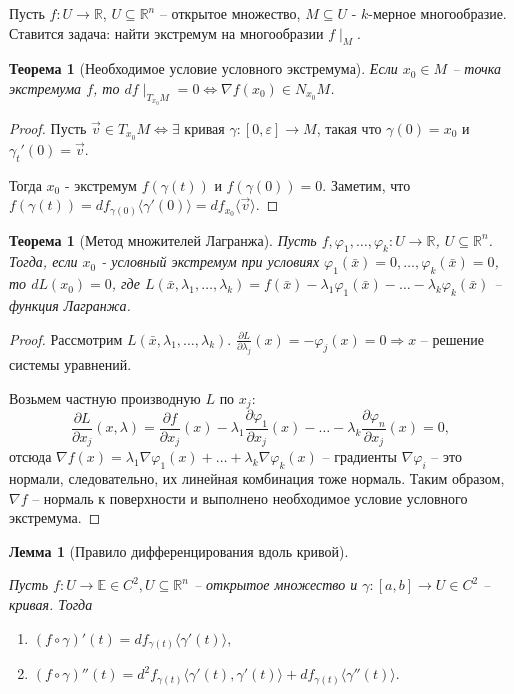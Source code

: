 \documentclass[a5paper]{article}
\newcounter{through}
\theoremstyle{plain}
\newtheorem{theorem}[through]{Теорема}
\newtheorem{lemma}[through]{Лемма}
\theoremstyle{definition}
\numberwithin{through}{section}
\numberwithin{equation}{section}
\begin{document}
Пусть $f: U \to \mathbb{R}$, $U \subseteq \mathbb{R}^n$ -- открытое множество, $M \subseteq U$ - $k$-мерное многообразие. Ставится задача: найти экстремум на многообразии $f\mid_{M}$.

\begin{theorem}[Необходимое условие условного экстремума]
	Если $x_0 \in M$ -- точка экстремума $f$, то $df\mid_{T_{x_0}M} = 0 \Leftrightarrow \nabla f(x_0) \in N_{x_0}M$.
\end{theorem}

\begin{proof}
	Пусть $\vec{v} \in T_{x_0}M \Longleftrightarrow \exists $ кривая $\gamma : [0, \varepsilon] \to M$, такая что $\gamma(0) = x_0$ и $\gamma_t'(0) = \vec{v}$.
	
	Тогда $x_0$ - экстремум $f(\gamma(t))$ и $f(\gamma(0)) = 0$. Заметим, что $f(\gamma(t))= df_{\gamma(0)}\langle \gamma'(0)\rangle=df_{x_0} \langle \vec{v} \rangle$.
\end{proof}

\begin{theorem}[Метод множителей Лагранжа]
	Пусть $f, \varphi_1, \ldots, \varphi_k : U \to \mathbb{R}$, $U \subseteq \mathbb{R}^n$. Тогда, если $x_0$ - условный экстремум при условиях $\varphi_1(\bar{x}) = 0, \ldots, \varphi_k(\bar{x})  = 0$, то $dL(x_0) = 0$, где $L(\bar{x}, \lambda_1, \ldots, \lambda_k)=f(\bar{x}) - \lambda_1\varphi_1(\bar{x}) - \ldots - \lambda_k\varphi_k(\bar{x})$ -- функция Лагранжа.
\end{theorem}

\begin{proof}
	Рассмотрим $L(\bar{x}, \lambda_1,\ldots,\lambda_k)$. $\frac{\partial L}{\partial \lambda_j}(x) = - \varphi_j(x) = 0 \Rightarrow x$ -- решение системы уравнений. 
	
	Возьмем частную производную $L$ по $x_j$:
	\[ \frac{\partial L}{\partial x_j} (x, \lambda) = \frac{\partial f}{\partial x_j}(x) - 
	\lambda_1\frac{\partial \varphi_1}{\partial x_j}(x) - 
	\ldots - \lambda_k \frac{\partial \varphi_n}{\partial x_j}(x) = 0, \]
	отсюда $\nabla f(x) = \lambda_1\nabla\varphi_1(x) + \ldots +
	\lambda_k\nabla\varphi_k(x) $ -- градиенты $\nabla\varphi_i$ -- это нормали, следовательно, их линейная комбинация тоже нормаль. Таким образом, $\nabla f$ -- нормаль к поверхности и выполнено необходимое условие условного экстремума.
	\end{proof}



\begin{lemma}[Правило дифференцирования вдоль кривой] 
	\label{CurveDiffRule}
	\
	
	Пусть $f: U \to \mathbb{E} \in C^2, U \subseteq \mathbb{R}^n$ -- открытое множество 
	и $\gamma:[a, b] \to U \in C^2$ -- кривая. Тогда
	\begin{enumerate}
		\item 
		$(f\circ\gamma)'(t) = df_{\gamma(t)} \langle \gamma'(t)\rangle,$
		\item 
		$(f\circ\gamma)''(t) = d^2f_{\gamma(t)} \langle \gamma'(t), 
		\gamma'(t)\rangle + df_{\gamma(t)} \langle \gamma''(t) \rangle.$
	\end{enumerate}
\end{lemma}
\end{document}
